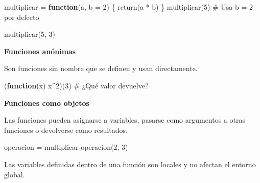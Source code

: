 \documentclass[
  spanish,
  letterpaper,
  DIV=11,
  numbers=noendperiod]{scrreprt}
\newenvironment{Shaded}{\begin{snugshade}}{\end{snugshade}}
\newcommand{\AttributeTok}[1]{\textcolor[rgb]{0.40,0.45,0.13}{#1}}
\newcommand{\CommentTok}[1]{\textcolor[rgb]{0.37,0.37,0.37}{#1}}
\newcommand{\ControlFlowTok}[1]{\textcolor[rgb]{0.00,0.23,0.31}{\textbf{#1}}}
\newcommand{\DecValTok}[1]{\textcolor[rgb]{0.68,0.00,0.00}{#1}}
\newcommand{\FunctionTok}[1]{\textcolor[rgb]{0.28,0.35,0.67}{#1}}
\newcommand{\NormalTok}[1]{\textcolor[rgb]{0.00,0.23,0.31}{#1}}
\newcommand{\OtherTok}[1]{\textcolor[rgb]{0.00,0.23,0.31}{#1}}
\newcommand{\SpecialCharTok}[1]{\textcolor[rgb]{0.37,0.37,0.37}{#1}}
\begin{document}
\begin{Shaded}
\begin{Highlighting}[]
\NormalTok{multiplicar }\OtherTok{=} \ControlFlowTok{function}\NormalTok{(a, }\AttributeTok{b =} \DecValTok{2}\NormalTok{) \{}
  \FunctionTok{return}\NormalTok{(a }\SpecialCharTok{*}\NormalTok{ b)}
\NormalTok{\}}
\FunctionTok{multiplicar}\NormalTok{(}\DecValTok{5}\NormalTok{)  }\CommentTok{\# Usa b = 2 por defecto}

\FunctionTok{multiplicar}\NormalTok{(}\DecValTok{5}\NormalTok{, }\DecValTok{3}\NormalTok{)}
\end{Highlighting}
\end{Shaded}

\textbf{Funciones anónimas}

Son funciones sin nombre que se definen y usan directamente.

\begin{Shaded}
\begin{Highlighting}[]
\NormalTok{(}\ControlFlowTok{function}\NormalTok{(x) x}\SpecialCharTok{\^{}}\DecValTok{2}\NormalTok{)(}\DecValTok{3}\NormalTok{)  }\CommentTok{\# ¿Qué valor devuelve?}
\end{Highlighting}
\end{Shaded}

\textbf{Funciones como objetos}

Las funciones pueden asignarse a variables, pasarse como argumentos a
otras funciones o devolverse como resultados.

\begin{Shaded}
\begin{Highlighting}[]
\NormalTok{operacion }\OtherTok{=}\NormalTok{ multiplicar}
\FunctionTok{operacion}\NormalTok{(}\DecValTok{2}\NormalTok{, }\DecValTok{3}\NormalTok{)  }
\end{Highlighting}
\end{Shaded}

\begin{tcolorbox}[enhanced jigsaw, arc=.35mm, bottomrule=.15mm, bottomtitle=1mm, breakable, colback=white, colbacktitle=quarto-callout-note-color!10!white, colframe=quarto-callout-note-color-frame, coltitle=black, left=2mm, leftrule=.75mm, opacityback=0, opacitybacktitle=0.6, rightrule=.15mm, title=\textcolor{quarto-callout-note-color}{\faInfo}\hspace{0.5em}{Nota}, titlerule=0mm, toprule=.15mm, toptitle=1mm]

Las variables definidas dentro de una función son locales y no afectan
el entorno global.

\end{tcolorbox}
\end{document}
